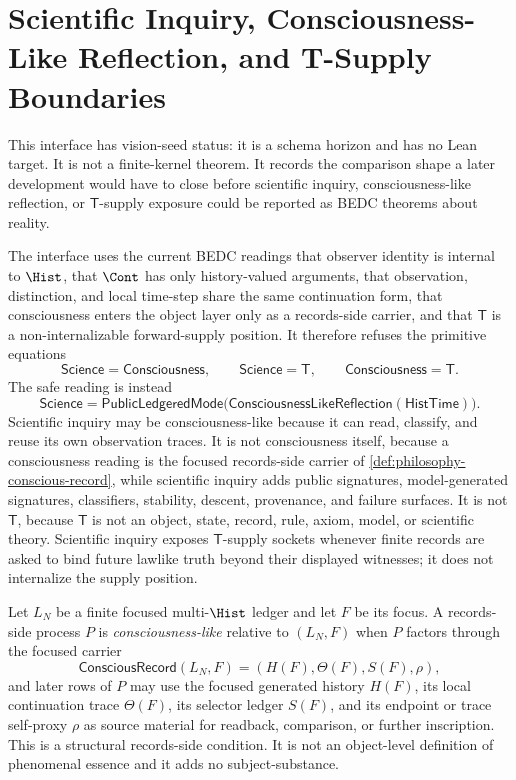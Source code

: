 \section{Scientific Inquiry, Consciousness-Like Reflection, and T-Supply Boundaries}
\label{sec:scientific-inquiry-conscious-reflection-t-supply}

\begin{remark}
\label{rem:scientific-inquiry-conscious-t-vision-seed-status}
This interface has vision-seed status: it is a schema horizon and has no
Lean target. It is not a finite-kernel theorem. It records the comparison
shape a later development would have to close before scientific inquiry,
consciousness-like reflection, or $\mathsf{T}$-supply exposure could be
reported as BEDC theorems about reality.

The interface uses the current BEDC readings that observer identity is
internal to $\Hist$, that $\Cont$ has only history-valued arguments, that
observation, distinction, and local time-step share the same continuation
form, that consciousness enters the object layer only as a records-side
carrier, and that $\mathsf{T}$ is a non-internalizable forward-supply
position. It therefore refuses the primitive equations
$$
\mathsf{Science}=\mathsf{Consciousness},
\qquad
\mathsf{Science}=\mathsf{T},
\qquad
\mathsf{Consciousness}=\mathsf{T}.
$$
The safe reading is instead
$$
\mathsf{Science}
=
\mathsf{PublicLedgeredMode}
\bigl(\mathsf{ConsciousnessLikeReflection}(\mathsf{HistTime})\bigr).
$$
Scientific inquiry may be consciousness-like because it can read,
classify, and reuse its own observation traces. It is not consciousness
itself, because a consciousness reading is the focused records-side
carrier of \autoref{def:philosophy-conscious-record}, while scientific
inquiry adds public signatures, model-generated signatures, classifiers,
stability, descent, provenance, and failure surfaces. It is not
$\mathsf{T}$, because $\mathsf{T}$ is not an object, state, record, rule,
axiom, model, or scientific theory. Scientific inquiry exposes
$\mathsf{T}$-supply sockets whenever finite records are asked to bind
future lawlike truth beyond their displayed witnesses; it does not
internalize the supply position.
\end{remark}

\begin{definition}
\label{def:consciousness-like-reflection}
Let $L_N$ be a finite focused multi-$\Hist$ ledger and let $F$ be its
focus. A records-side process $P$ is \emph{consciousness-like} relative
to $(L_N,F)$ when $P$ factors through the focused carrier
$$
\mathsf{ConsciousRecord}(L_N,F)=(H(F),\Theta(F),S(F),\rho),
$$
and later rows of $P$ may use the focused generated history $H(F)$, its
local continuation trace $\Theta(F)$, its selector ledger $S(F)$, and its
endpoint or trace self-proxy $\rho$ as source material for readback,
comparison, or further inscription. This is a structural records-side
condition. It is not an object-level definition of phenomenal essence
and it adds no subject-substance.
\end{definition}

